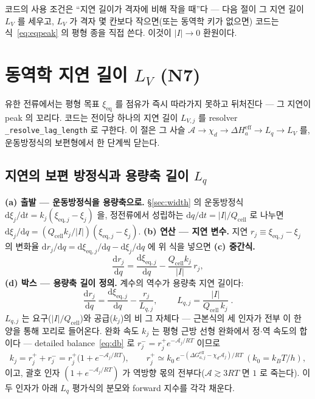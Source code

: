 \documentclass[11pt,a4paper]{article}
\newcommand{\dd}{\mathrm{d}}
\newcommand{\eff}{\mathrm{eff}}
\newcommand{\eq}{\mathrm{eq}}
\newcommand{\cell}{\mathrm{cell}}
\newcommand{\code}[1]{\texttt{#1}}
\begin{document}
코드의 사용 조건은 ``지연 길이가 격자에 비해 작을 때''다 — 다음 절이 그 지연 길이 $L_V$ 를 세우고, $L_V$ 가 격자
몇 칸보다 작으면(또는 동역학 키가 없으면) 코드는 식~\eqref{eq:eqpeak} 의 평형 종을 직접 쓴다. 이것이 $|I|\to0$ 환원이다.

\section{동역학 지연 길이 $L_V$ (N7)}\label{sec:lag}
유한 전류에서는 평형 목표 $\xi_\eq$ 를 점유가 즉시 따라가지 못하고 뒤처진다 — 그 지연이 peak 의 꼬리다. 코드는 전이당
하나의 지연 길이 $L_{V,j}$ 를 resolver \code{\_resolve\_lag\_length} 로 구한다. 이 절은 그 사슬
$\mathcal A\to\chi_d\to\Delta H_a^\eff\to L_q\to L_V$ 를, 운동방정식의 보편형에서 한 단계씩 닫는다.

\subsection{지연의 보편 방정식과 용량축 길이 $L_q$}
\textbf{(a) 출발 — 운동방정식을 용량축으로.} \S\ref{sec:width} 의 운동방정식 $\dd\xi_j/\dd t=k_j(\xi_{\eq,j}-\xi_j)$
을, 정전류에서 성립하는 $\dd q/\dd t=|I|/Q_\cell$ 로 나누면 $\dd\xi_j/\dd q=(Q_\cell k_j/|I|)(\xi_{\eq,j}-\xi_j)$.
\textbf{(b) 연산 — 지연 변수.} 지연 $r_j\equiv\xi_{\eq,j}-\xi_j$ 의 변화율 $\dd r_j/\dd q=\dd\xi_{\eq,j}/\dd q-\dd\xi_j/\dd q$
에 위 식을 넣으면 \textbf{(c) 중간식.}
\begin{equation}
\frac{\dd r_j}{\dd q}=\frac{\dd\xi_{\eq,j}}{\dd q}-\frac{Q_\cell k_j}{|I|}\,r_j,
\label{eq:Lqmid}
\end{equation}
\textbf{(d) 박스 — 용량축 길이 정의.} 계수의 역수가 용량축 지연 길이다:
\begin{equation}
\frac{\dd r_j}{\dd q}=\frac{\dd\xi_{\eq,j}}{\dd q}-\frac{r_j}{L_{q,j}},
\qquad \boxed{\;L_{q,j}=\frac{|I|}{Q_\cell\,k_j}\;.}
\label{eq:Lq}
\end{equation}
$L_{q,j}$ 는 요구($|I|/Q_\cell$)와 공급($k_j$)의 비 그 자체다 — 근본식의 세 인자가 전부 이 한 양을 통해 꼬리로
들어온다. 완화 속도 $k_j$ 는 평형 근방 선형 완화에서 정$\cdot$역 속도의 합이다 — detailed balance~\eqref{eq:db} 로
$r_j^-=r_j^+e^{-\mathcal A_j/RT}$ 이므로
\begin{equation}
k_j=r_j^++r_j^-=r_j^+\big(1+e^{-\mathcal A_j/RT}\big),
\qquad r_j^+\simeq k_0\,e^{-(\Delta G_{a,j}^\eff-\chi_d\mathcal A_j)/RT}\ (k_0=k_BT/h),
\label{eq:kuniv}
\end{equation}
이고, 괄호 인자 $(1+e^{-\mathcal A_j/RT})$ 가 역방향 몫의 전부다($\mathcal A\gtrsim3RT$ 면 $1$ 로 죽는다). 이 두 인자가
아래 $L_q$ 평가식의 분모와 forward 지수를 각각 채운다.
\end{document}
